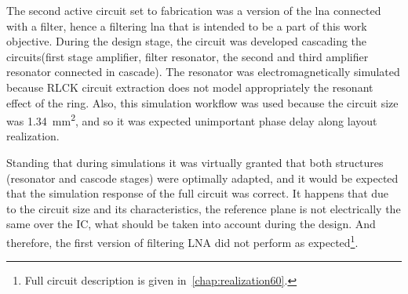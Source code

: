 The second active circuit set to fabrication was a version of the \gls{lna} connected with a filter, hence a filtering \gls{lna} that is intended to be a part of this work objective. During the design stage, the circuit was developed cascading the circuits(first stage amplifier, filter resonator, the second and third amplifier resonator connected in cascade). The resonator was electromagnetically simulated because RLCK circuit extraction does not model appropriately the resonant effect of the ring. Also, this simulation workflow was used because the circuit size was \SI{1.34}{\square\milli\metre}, and so it was expected unimportant phase delay along layout realization.



Standing that during simulations it was virtually granted that both structures (resonator and cascode stages) were optimally adapted, and it would be expected that the simulation response of the full circuit was correct. It happens that due to the circuit size and its characteristics, the reference plane is not electrically the same over the IC, what should be taken into account during the design. And therefore, the first version of filtering LNA did not perform as expected\footnote{Full circuit description is given in~\autoref{chap:realization60}.}.

